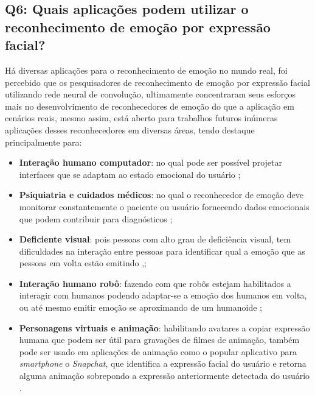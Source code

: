 \subsection{Q6: Quais aplicações podem utilizar o reconhecimento de emoção por expressão facial?}
Há diversas aplicações para o reconhecimento de emoção no mundo real, foi percebido que os pesquisadores de reconhecimento de emoção por expressão facial utilizando rede neural de convolução, ultimamente concentraram seus esforços mais no desenvolvimento de reconhecedores de emoção do que a aplicação em cenários reais, mesmo assim, está aberto para trabalhos futuros inúmeras aplicações desses reconhecedores em diversas áreas, tendo destaque principalmente para: 

\begin{itemize}
\item \textbf{Interação humano computador}: no qual pode ser possível projetar interfaces que se adaptam ao estado emocional do usuário \citep{art1, art3, art5,art8};
\item \textbf{Psiquiatria e cuidados médicos}: 
no qual o reconhecedor de emoção deve monitorar constantemente o paciente ou usuário
fornecendo dados emocionais que podem contribuir para diagnósticos \citep{art1, art3, art12};
\item \textbf{Deficiente visual}: pois pessoas com alto grau de deficiência visual, tem dificuldades na
interação entre pessoas para identificar qual a emoção que as pessoas em volta estão emitindo \citep{art15},;
\item \textbf{Interação humano robô}: fazendo com que robôs estejam habilitados
a interagir com humanos podendo adaptar-se a emoção dos humanos em volta, 
ou até mesmo emitir emoção se aproximando de um humanoide \citep{art6, art14};
\item \textbf{Personagens virtuais e animação}: 
habilitando avatares a copiar expressão humana que podem ser útil para gravações de filmes de animação,
também pode ser usado em aplicações de animação como o popular aplicativo para \textit{smartphone} o \textit{Snapchat},
que identifica a expressão facial do usuário e retorna alguma animação sobrepondo a expressão anteriormente detectada do usuário \citep{art9, art11}.
\end{itemize}

